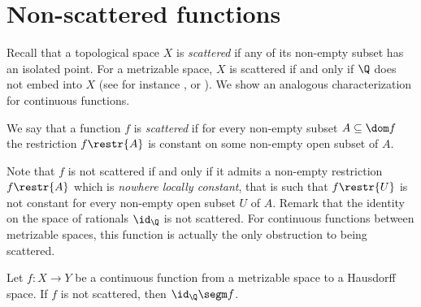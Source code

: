\section{Non-scattered functions}

Recall that a topological space $X$ is \emph{scattered} if any of its non-empty subset has an isolated point.
For a metrizable space, $X$ is scattered if and only if $\Q$ does not embed into $X$ (see for instance \cite[Théorème 2]{MR0107849}, or \cite[Notes on (7.12)]{kechris}).
We show an analogous characterization for continuous functions.
\begin{definition}
We say that a function $f$ is \emph{scattered} if for every non-empty subset $A\subseteq \dom f$ the restriction $f\restr{A}$ is constant on some non-empty open subset of $A$.
\end{definition}
 Note that $f$ is not scattered if and only if it admits a non-empty restriction $f\restr{A}$ which is \emph{nowhere locally constant},
 that is such that $f\restr{U}$ is not constant for every non-empty open subset $U$ of $A$. 
Remark that  the identity on the space of rationals $\id_\Q$ is not scattered. For continuous functions between metrizable spaces, this function is actually the only obstruction to being scattered.


\begin{theorem}\label{prop:nlc_implies_nonscattered}
Let $f:X\to Y$ be a continuous function from a metrizable space to a Hausdorff space.
If $f$ is not scattered, then $\id_\Q\segm f$.  
\end{theorem}

